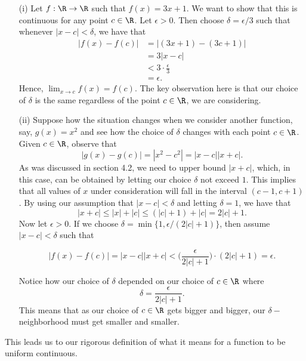 \begin{ex}
\begin{enumerate}
    \item[(i)] Let \( f: \R \to \R  \) such that \( f(x) = 3x + 1  \). We want to show that this is continuous for any point \( c \in \R  \). Let \( \epsilon  > 0  \). Then choose \( \delta = \epsilon  / 3  \) such that whenever \( | x - c  | < \delta  \), we have that 
\begin{align*}
    | f(x) - f(c) | &= |  (3x + 1 ) - (3c + 1 ) |  \\
                    &= 3 | x - c  | \\
                    &< 3 \cdot \frac{ \epsilon  }{ 3 } \\
                    &= \epsilon.
\end{align*}
Hence, \( \lim_{ x \to c } f(x) = f(c) \). The key observation here is that our choice of \( \delta  \) is the same regardless of the point \( c \in \R  \), we are considering.
    \item[(ii)] Suppose how the situation changes when we consider another function, say, \( g(x) = x^2  \) and see how the choice of \( \delta  \) changes with each point \( c \in \R  \). Given \( c \in \R  \), observe that 
        \[  | g(x) - g(c) | = | x^2 - c^2  | = | x -c | | x + c  |.  \]
As was discussed in section 4.2, we need to upper bound \( | x + c  |  \), which, in this case, can be obtained by letting our choice \( \delta \) not exceed \( 1 \). This implies that all values of \( x  \) under consideration will fall in the interval \( (c - 1, c + 1 ) \). By using our assumption that \( | x - c  | < \delta  \) and letting \( \delta = 1  \), we have that 
\[  | x + c  | \leq | x | + | c  | \leq (| c  | + 1 ) + | c  | = 2 | c | + 1  . \] Now let \( \epsilon  > 0  \). If we choose \( \delta = \min \{ 1, \epsilon / (2 | c  | + 1 ) \} \), then assume \( | x - c  | < \delta  \) such that 

\[ | f(x) - f(c)  | = | x - c  | | x + c  | < \Big( \frac{ \epsilon  }{ 2 | c  | + 1  }  \Big) \cdot ( 2 | c  | + 1) = \epsilon. \]

Notice how our choice of \( \delta \) depended on our choice of \( c \in \R  \) where 
\[  \delta = \frac{ \epsilon  }{ 2 | c  | + 1  }. \]
This means that as our choice of \( c \in \R  \) gets bigger and bigger, our \( \delta - \)neighborhood must get smaller and smaller.
\end{enumerate}
\end{ex}


This leads us to our rigorous definition of what it means for a function to be uniform continuous.


